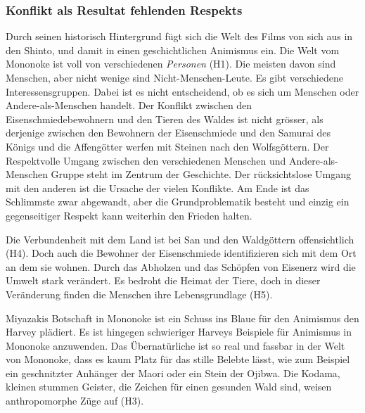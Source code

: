 \subsubsection{Konflikt als Resultat fehlenden Respekts} 
Durch seinen historisch Hintergrund fügt sich die Welt des Films von sich aus in den Shinto, und damit in einen geschichtlichen Animismus ein. Die Welt vom Mononoke ist voll von verschiedenen \emph{Personen} (H1). Die meisten davon sind Menschen, aber nicht wenige sind Nicht-Menschen-Leute. Es gibt verschiedene Interessensgruppen. Dabei ist es nicht entscheidend, ob es sich um Menschen oder Andere-als-Menschen handelt. Der Konflikt zwischen den Eisenschmiedebewohnern und den Tieren des Waldes ist nicht grösser, als derjenige zwischen den Bewohnern der Eisenschmiede und den Samurai des Königs und die Affengötter werfen mit Steinen nach den Wolfsgöttern. Der Respektvolle Umgang zwischen den verschiedenen Menschen und Andere-als-Menschen Gruppe steht im Zentrum der Geschichte. Der rücksichtslose Umgang mit den anderen ist die Ursache der vielen Konflikte. Am Ende ist das Schlimmste zwar abgewandt, aber die Grundproblematik besteht und einzig ein gegenseitiger Respekt kann weiterhin den Frieden halten. 
 
Die Verbundenheit mit dem Land ist bei San und den Waldgöttern offensichtlich (H4). Doch auch die Bewohner der Eisenschmiede identifizieren sich mit dem Ort an dem sie wohnen. Durch das Abholzen und das Schöpfen von Eisenerz wird die Umwelt stark verändert. Es bedroht die Heimat der Tiere, doch in dieser Veränderung finden die Menschen ihre Lebensgrundlage (H5).

Miyazakis Botschaft in Mononoke ist ein Schuss ins Blaue für den Animismus den Harvey plädiert. Es ist hingegen schwieriger Harveys Beispiele für Animismus in Mononoke anzuwenden. Das Übernatürliche ist so real und fassbar in der Welt von Mononoke, dass es kaum Platz für das stille Belebte lässt, wie zum Beispiel ein geschnitzter Anhänger der Maori oder ein Stein der Ojibwa. Die Kodama, kleinen stummen Geister, die Zeichen für einen gesunden Wald sind, weisen anthropomorphe Züge auf (H3). 

